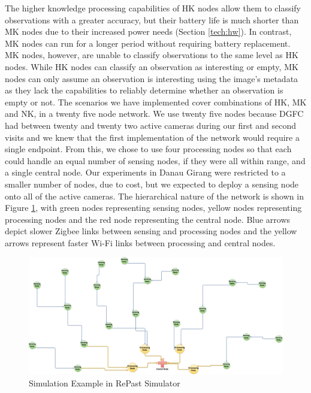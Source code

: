 The higher knowledge processing capabilities of HK nodes allow them to classify observations with a greater accuracy, but their battery life is much shorter than MK nodes due to their increased power needs (Section \ref{tech:hw}). In contrast, MK nodes can run for a longer period without requiring battery replacement. MK nodes, however, are unable to classify observations to the same level as HK nodes. While HK nodes can classify an observation as interesting or empty, MK nodes can only assume an observation is interesting using the image's metadata as they lack the capabilities to reliably determine whether an observation is empty or not. The scenarios we have implemented cover combinations of HK, MK and NK, in a twenty five node network. We use twenty five nodes because DGFC had between twenty and twenty two active cameras during our first and second visits and we knew that the first implementation of the network would require a single endpoint. From this, we chose to use four processing nodes so that each could handle an equal number of sensing nodes, if they were all within range, and a single central node. Our experiments in Danau Girang were restricted to a smaller number of nodes, due to cost, but we expected to deploy a sensing node onto all of the active cameras. The hierarchical nature of the network is shown in Figure \ref{fig:sim}, with green nodes representing sensing nodes, yellow nodes representing processing nodes and the red node representing the central node. Blue arrows depict slower Zigbee links between sensing and processing nodes and the yellow arrows represent faster Wi-Fi links between processing and central nodes.

	\begin{figure}[h]
	\centering
	\includegraphics[width=\textwidth]{Chap7/figures/KHASARCH}
	\caption{Simulation Example in RePast Simulator}
	\label{fig:sim}
	\end{figure}

